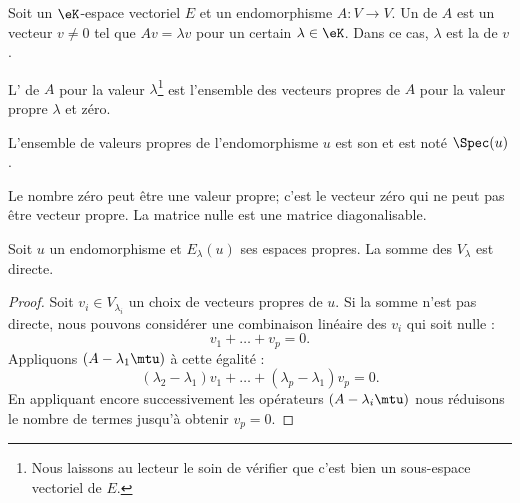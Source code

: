 \begin{definition}      \label{DefooMMKZooVcskCc}
    Soit un \( \eK\)-espace vectoriel \( E\) et un endomorphisme \( A\colon V\to V\). Un  de \( A\) est un vecteur \( v \neq 0\) tel que \( Av=\lambda v\) pour un certain \( \lambda\in \eK\). Dans ce cas, \( \lambda\) est la  de \( v\).

    L' de \( A\) pour la valeur \( \lambda\)\footnote{Nous laissons au lecteur le soin de vérifier que c'est bien un sous-espace vectoriel de \( E\).} est l'ensemble des vecteurs propres de \( A\) pour la valeur propre \( \lambda\) et zéro.
\end{definition}
L'ensemble de valeurs propres de l'endomorphisme \( u\) est son  et est noté \( \Spec(u)\).

\begin{remark}
    Le nombre zéro peut être une valeur propre; c'est le vecteur zéro qui ne peut pas être vecteur propre. La matrice nulle est une matrice diagonalisable.
\end{remark}

\begin{lemma}       \label{LemjcztYH}
    Soit \( u\) un endomorphisme et \( E_{\lambda}(u)\) ses espaces propres. La somme des \( V_{\lambda}\) est directe.
\end{lemma}

\begin{proof}
    Soit \( v_i\in V_{\lambda_i}\) un choix de vecteurs propres de \( u\). Si la somme n'est pas directe, nous pouvons considérer une combinaison linéaire des \( v_i\) qui soit nulle :
    \begin{equation}
        v_1+\ldots+v_p=0.
    \end{equation}
    Appliquons \( (A-\lambda_1\mtu)\) à cette égalité :
    \begin{equation}
        (\lambda_2-\lambda_1)v_1+\ldots+(\lambda_p-\lambda_1)v_p=0.
    \end{equation}
    En appliquant encore successivement les opérateurs \( (A-\lambda_i\mtu)\) nous réduisons le nombre de termes jusqu'à obtenir \( v_p=0\).
\end{proof}

